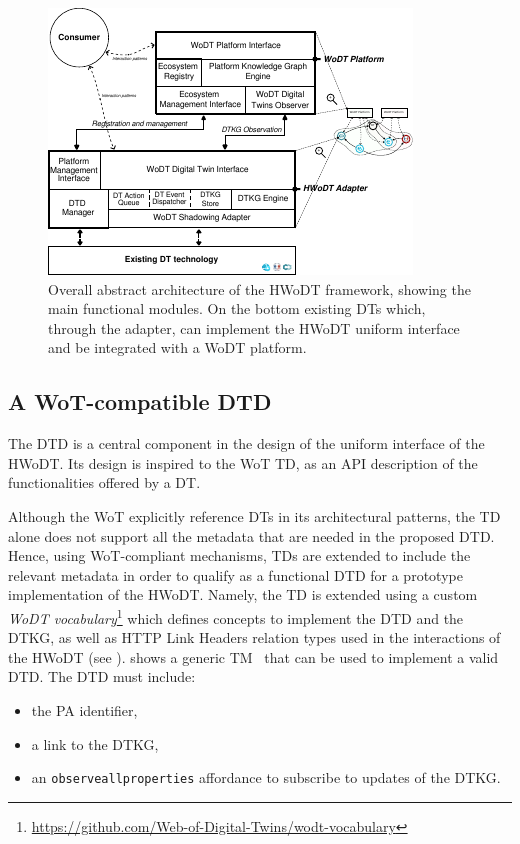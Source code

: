 \begin{figure}
  \centering
  \includegraphics[width=0.8\columnwidth]{figures/hwodt/abstract_arch.pdf}
  \caption{Overall abstract architecture of the \ac{HWoDT} framework, showing the main functional modules. On the bottom existing \acp{DT} which, through the adapter, can implement the \ac{HWoDT} uniform interface and be integrated with a \ac{WoDT} platform.}
  \label{fig:abstract_arch}
\end{figure}



\subsection{A \ac{WoT}-compatible \acl{DTD}}

The \ac{DTD} is a central component in the design of the uniform interface of the \ac{HWoDT}.
%
Its design is inspired to the \ac{WoT} \ac{TD}, as an \ac{API} description of the functionalities offered by a \ac{DT}.

Although the \ac{WoT} explicitly reference \acp{DT} in its architectural patterns, the \ac{TD} alone does not support all the metadata that are needed in the proposed \ac{DTD}.
Hence, using \ac{WoT}-compliant mechanisms, \acp{TD} are extended to include the relevant metadata in order to qualify as a functional \ac{DTD} for a prototype implementation of the \ac{HWoDT}.
%
Namely, the \ac{TD} is extended using a custom \emph{\ac{WoDT} vocabulary}\footnote{\url{https://github.com/Web-of-Digital-Twins/wodt-vocabulary}}
which defines concepts to implement the \ac{DTD} and the \ac{DTKG}, as well as HTTP Link Headers relation types used in the interactions of the \ac{HWoDT} (see ).
%
 shows a generic \ac{TM}~\cite{wot-td} that can be used to implement a valid \ac{DTD}. The \ac{DTD} must include:
\begin{itemize}
    \item the \ac{PA} identifier, 
    \item a link to the \ac{DTKG},
    \item an \texttt{observeallproperties} affordance to subscribe to updates of the \ac{DTKG}.
\end{itemize}

